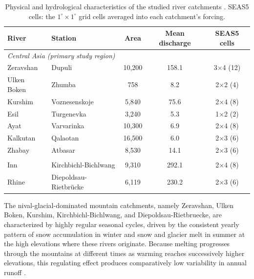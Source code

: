 \documentclass[review,12pt,authoryear]{elsarticle}
\begin{document}
\begin{table}[h]
    \centering
    \small
    \setlength{\tabcolsep}{3.5pt}
    \begin{tabular}{llccc}
        \toprule
        \textbf{River} & \textbf{Station} & \textbf{Area} & \textbf{Mean discharge} & \textbf{SEAS5 cells} \\
        \midrule
        \multicolumn{5}{l}{\textit{Central Asia (primary study region)}} \\
        Zeravshan   & Dupuli          & 10{,}200 & 158.1 & 3$\times$4 (12) \\
        Ulken Boken & Zhumba          & 758      & 8.2   & 2$\times$2 (4) \\
        Kurshim     & Voznesenskoje   & 5{,}840  & 75.6  & 2$\times$4 (8) \\
        Esil        & Turgenevka      & 3{,}240  & 5.3   & 1$\times$2 (2) \\
        Ayat        & Varvarinka      & 10{,}300 & 6.9   & 2$\times$4 (8) \\
        Kalkutan    & Qalaotan        & 16{,}500 & 6.0   & 2$\times$3 (6) \\
        Zhabay      & Atbasar         & 8{,}530  & 14.1  & 2$\times$3 (6) \\
        \addlinespace
        \multicolumn{5}{l}{\textit{Europe}} \\
        Inn         & Kirchbichl-Bichlwang     & 9{,}310 & 292.1 & 2$\times$4 (8) \\
        Rhine       & Diepoldsau-Rietbr\"ucke  & 6{,}119 & 230.2 & 2$\times$3 (6) \\
        \bottomrule
    \end{tabular}
    \caption{Physical and hydrological characteristics of the studied river catchments \citetext{\citealp{grdc2026}; Kazhydromet, unpublished data, 2025; Tajik Hydromet, unpublished data, 2025}. SEAS5 cells: the $1^\circ\times1^\circ$ grid cells averaged into each catchment's forcing.}
    \label{tab:catchments}
\end{table}


The nival-glacial-dominated mountain catchments, namely Zeravshan, Ulken Boken, Kurshim, Kirchbichl-Bichlwang, and Diepoldsau-Rietbruecke, are characterized by highly regular seasonal cycles, driven by the consistent yearly pattern of snow accumulation in winter and snow and glacier melt in summer at the high elevations where these rivers originate. Because melting progresses through the mountains at different times as warming reaches successively higher elevations, this regulating effect produces comparatively low variability in annual runoff \citep{siegfried2024}.
\end{document}
